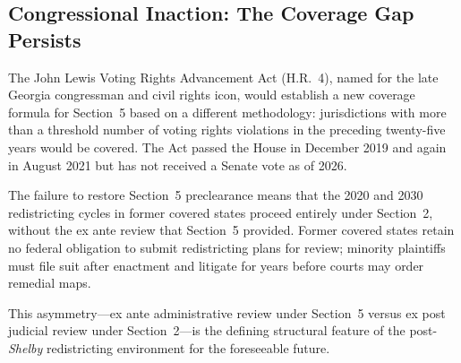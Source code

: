 \subsection{Congressional Inaction: The Coverage Gap Persists}

The John Lewis Voting Rights Advancement Act (H.R.~4), named for the late
Georgia congressman and civil rights icon, would establish a new coverage
formula for Section~5 based on a different methodology: jurisdictions
with more than a threshold number of voting rights violations in the
preceding twenty-five years would be covered. The Act passed the House
in December 2019 and again in August 2021 but has not received a Senate
vote as of 2026.

The failure to restore Section~5 preclearance means that the 2020 and
2030 redistricting cycles in former covered states proceed entirely under
Section~2, without the ex ante review that Section~5 provided. Former
covered states retain no federal obligation to submit redistricting plans
for review; minority plaintiffs must file suit after enactment and litigate
for years before courts may order remedial maps.

This asymmetry---ex ante administrative review under Section~5 versus
ex post judicial review under Section~2---is the defining structural
feature of the post-\textit{Shelby} redistricting environment for the
foreseeable future.
